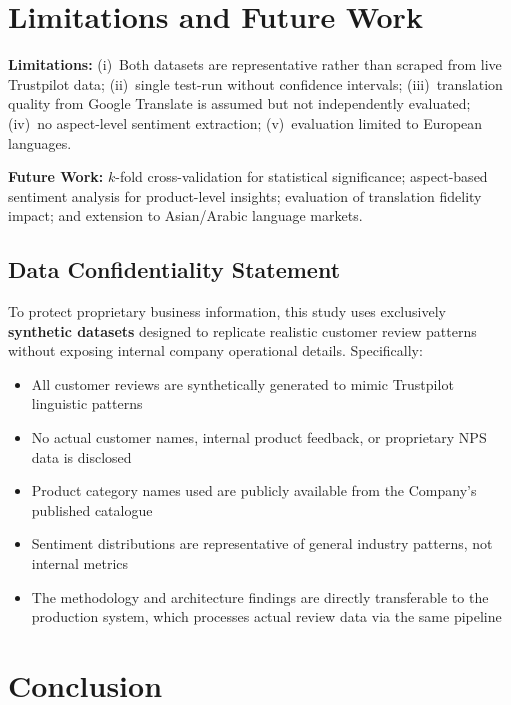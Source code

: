 \documentclass[10pt,twocolumn,a4paper]{article}
\begin{document}
\section{Limitations and Future Work}
\label{sec:limitations}

\textbf{Limitations:} (i)~Both datasets are representative rather than scraped from live Trustpilot data; (ii)~single test-run without confidence intervals; (iii)~translation quality from Google Translate is assumed but not independently evaluated; (iv)~no aspect-level sentiment extraction; (v)~evaluation limited to European languages.

\textbf{Future Work:} $k$-fold cross-validation for statistical significance; aspect-based sentiment analysis for product-level insights; evaluation of translation fidelity impact; and extension to Asian/Arabic language markets.

\subsection{Data Confidentiality Statement}

To protect proprietary business information, this study uses exclusively \textbf{synthetic datasets} designed to replicate realistic customer review patterns without exposing internal company operational details. Specifically:
\begin{itemize}[leftmargin=*,noitemsep,topsep=2pt]
    \item All customer reviews are synthetically generated to mimic Trustpilot linguistic patterns
    \item No actual customer names, internal product feedback, or proprietary NPS data is disclosed
    \item Product category names used are publicly available from the Company's published catalogue
    \item Sentiment distributions are representative of general industry patterns, not internal metrics
    \item The methodology and architecture findings are directly transferable to the production system, which processes actual review data via the same pipeline
\end{itemize}

\section{Conclusion}
\label{sec:conclusion}
\end{document}
